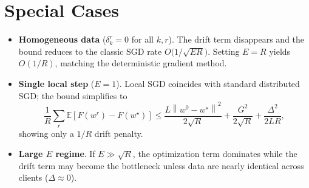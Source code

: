 \documentclass[11pt]{article}
\newcommand{\E}{\mathbb{E}}
\newcommand{\norm}[1]{\left\|#1\right\|}
\begin{document}
\section*{Special Cases}
\begin{itemize}
\item \textbf{Homogeneous data} ($\delta_{k}^{r}=0$ for all $k,r$).  
The drift term disappears and the bound reduces to the classic SGD rate $O\bigl(1/\sqrt{E R}\bigr)$. Setting $E=R$ yields $O(1/R)$, matching the deterministic gradient method.
\item \textbf{Single local step} ($E=1$).  
Local SGD coincides with standard distributed SGD; the bound simplifies to
\[
\frac{1}{R}\sum_{r}\E[F(w^{r})-F(w^{\star})]\le
\frac{L\norm{w^{0}-w^{\star}}^{2}}{2\sqrt{R}}+\frac{G^{2}}{2\sqrt{R}}+\frac{\Delta^{2}}{2L R},
\]
showing only a $1/R$ drift penalty.
\item \textbf{Large $E$ regime}.  
If $E\gg \sqrt{R}$, the optimization term dominates while the drift term may become the bottleneck unless data are nearly identical across clients ($\Delta\approx0$).
\end{itemize}
\end{document}
